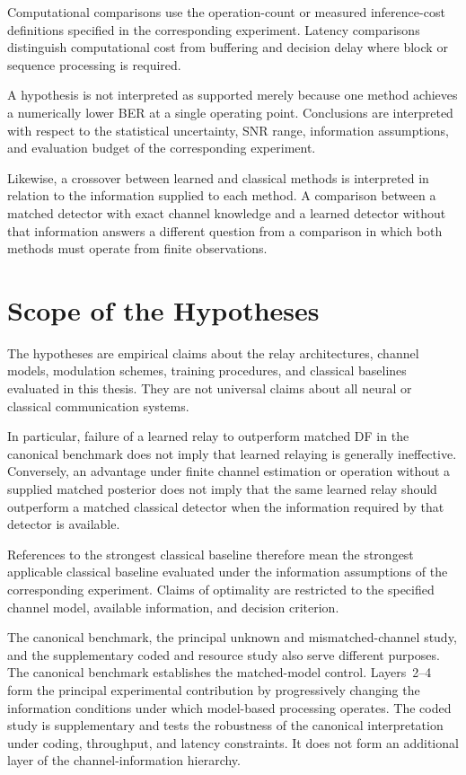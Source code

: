 Computational comparisons use the operation-count or measured inference-cost
definitions specified in the corresponding experiment. Latency comparisons
distinguish computational cost from buffering and decision delay where block
or sequence processing is required.

A hypothesis is not interpreted as supported merely because one method
achieves a numerically lower BER at a single operating point. Conclusions are
interpreted with respect to the statistical uncertainty, SNR range,
information assumptions, and evaluation budget of the corresponding
experiment.

Likewise, a crossover between learned and classical methods is interpreted in
relation to the information supplied to each method. A comparison between a
matched detector with exact channel knowledge and a learned detector without
that information answers a different question from a comparison in which both
methods must operate from finite observations.


\section{Scope of the Hypotheses}
\label{sec:hypothesis-scope}

The hypotheses are empirical claims about the relay architectures, channel
models, modulation schemes, training procedures, and classical baselines
evaluated in this thesis. They are not universal claims about all neural or
classical communication systems.

In particular, failure of a learned relay to outperform matched DF in the
canonical benchmark does not imply that learned relaying is generally
ineffective. Conversely, an advantage under finite channel estimation or
operation without a supplied matched posterior does not imply that the same
learned relay should outperform a matched classical detector when the
information required by that detector is available.

References to the strongest classical baseline therefore mean the strongest
applicable classical baseline evaluated under the information assumptions of
the corresponding experiment. Claims of optimality are restricted to the
specified channel model, available information, and decision criterion.

The canonical benchmark, the principal unknown and mismatched-channel study,
and the supplementary coded and resource study also serve different purposes.
The canonical benchmark establishes the matched-model control. Layers~2--4
form the principal experimental contribution by progressively changing the
information conditions under which model-based processing operates. The coded
study is supplementary and tests the robustness of the canonical
interpretation under coding, throughput, and latency constraints. It does not
form an additional layer of the channel-information hierarchy.


